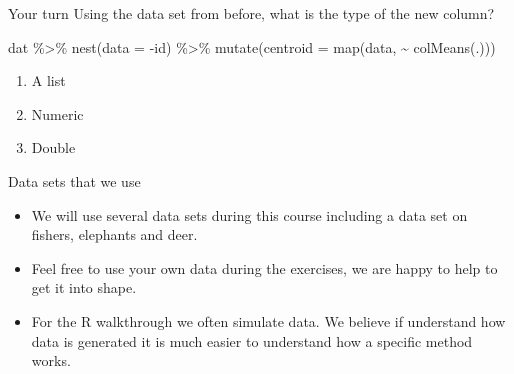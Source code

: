 \documentclass[ignorenonframetext,,t]{beamer}
\providecommand{\tightlist}{%
\setlength{\itemsep}{0pt}\setlength{\parskip}{0pt}}
\newenvironment{Shaded}{\begin{snugshade}}{\end{snugshade}}
\newcommand{\AttributeTok}[1]{\textcolor[rgb]{0.77,0.63,0.00}{#1}}
\newcommand{\FunctionTok}[1]{\textcolor[rgb]{0.00,0.00,0.00}{#1}}
\newcommand{\NormalTok}[1]{#1}
\newcommand{\SpecialCharTok}[1]{\textcolor[rgb]{0.00,0.00,0.00}{#1}}
\providecommand{\tightlist}{%
\setlength{\itemsep}{0pt}\setlength{\parskip}{0pt}}
\renewcommand{\tightlist}{\setlength{\itemsep}{1.4ex}\setlength{\parskip}{0pt}}
\begin{document}
\begin{frame}[fragile]{Your turn}
\protect\hypertarget{your-turn-3}{}
Using the data set from before, what is the type of the new column?

\begin{Shaded}
\begin{Highlighting}[]
\NormalTok{dat }\SpecialCharTok{\%\textgreater{}\%} \FunctionTok{nest}\NormalTok{(}\AttributeTok{data =} \SpecialCharTok{{-}}\NormalTok{id) }\SpecialCharTok{\%\textgreater{}\%} 
  \FunctionTok{mutate}\NormalTok{(}\AttributeTok{centroid =} \FunctionTok{map}\NormalTok{(data, }\SpecialCharTok{\textasciitilde{}} \FunctionTok{colMeans}\NormalTok{(.)))}
\end{Highlighting}
\end{Shaded}

\begin{enumerate}
\tightlist
\item
  A list
\item
  Numeric
\item
  Double
\end{enumerate}
\end{frame}

\begin{frame}{Data sets that we use}
\protect\hypertarget{data-sets-that-we-use}{}
\begin{itemize}
\tightlist
\item
  We will use several data sets during this course including a data set
  on fishers, elephants and deer.
\item
  Feel free to use your own data during the exercises, we are happy to
  help to get it into shape.
\item
  For the R walkthrough we often simulate data. We believe if understand
  how data is generated it is much easier to understand how a specific
  method works.
\end{itemize}
\end{frame}
\end{document}
